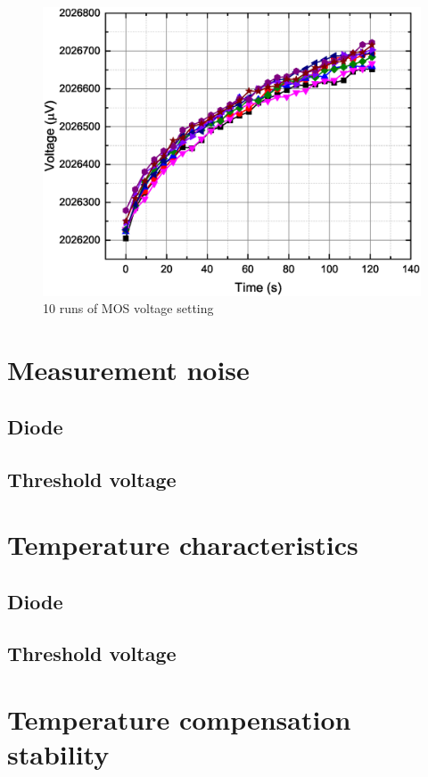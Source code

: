     \begin{figure}[H]
        \centering
        \includegraphics[width=0.8\paperwidth]{img/07/MOS_settling.eps}
        \caption{10 runs of MOS voltage setting}
        \label{MOS_settling}
    \end{figure}

\section{Measurement noise}
    \subsection{Diode}
    \subsection{Threshold voltage}

\section{Temperature characteristics}
    \subsection{Diode}
    \subsection{Threshold voltage}

\section{Temperature compensation stability}
